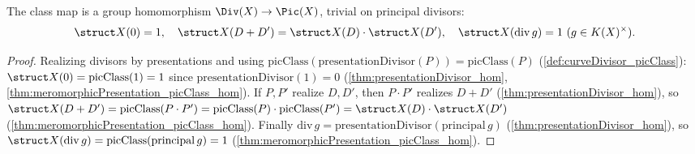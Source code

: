 \begin{theorem}
  \label{thm:curveDivisor_picClass_hom}
  \leanok
  The class map is a group homomorphism \(\Div(X) \to \Pic(X)\), trivial on principal divisors:
  \[
    \struct X(0) = 1, \quad \struct X(D + D') = \struct X(D) \cdot \struct X(D'), \quad \struct
    X(\mathrm{div}\, g) = 1 \ (g \in K(X)^{\times}).
  \]
\end{theorem}
\begin{proof}
  \leanok
  Realizing divisors by presentations and using
  \(\mathrm{picClass}(\mathrm{presentationDivisor}(P)) = \mathrm{picClass}(P)\)
  (\ref{def:curveDivisor_picClass}): \(\struct X(0) = \mathrm{picClass}(1) = 1\) since
  \(\mathrm{presentationDivisor}(1) = 0\) (\ref{thm:presentationDivisor_hom},
  \ref{thm:meromorphicPresentation_picClass_hom}). If \(P, P'\) realize \(D, D'\), then \(P \cdot
  P'\) realizes \(D + D'\) (\ref{thm:presentationDivisor_hom}), so \(\struct X(D + D') =
  \mathrm{picClass}(P \cdot P') = \mathrm{picClass}(P) \cdot \mathrm{picClass}(P') = \struct X(D)
  \cdot \struct X(D')\) (\ref{thm:meromorphicPresentation_picClass_hom}). Finally
  \(\mathrm{div}\, g = \mathrm{presentationDivisor}(\mathrm{principal}\, g)\)
  (\ref{thm:presentationDivisor_hom}), so \(\struct X(\mathrm{div}\, g) =
  \mathrm{picClass}(\mathrm{principal}\, g) = 1\) (\ref{thm:meromorphicPresentation_picClass_hom}).
\end{proof}

